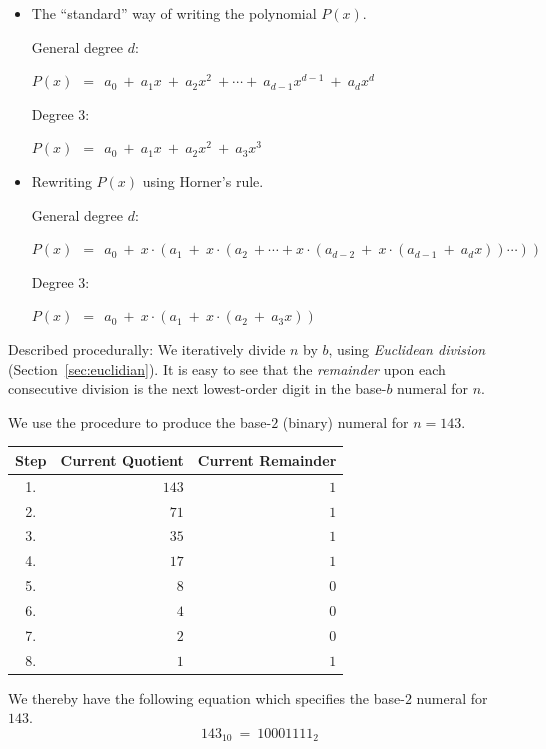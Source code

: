 \begin{itemize}
\item {\small\sf The ``standard'' way of writing the polynomial $P(x)$.}

\noindent General degree $d$:

$P(x) \ \ = \ \ a_0 \ + \ a_1 x \ + \ a_2 x^2 \ + \cdots + \ a_{d-1}
x^{d-1} \ + \ a_d x^d$

\noindent Degree $3$:

$P(x) \ \ = \ \ a_0 \ + \ a_1 x \ + \ a_2 x^2 \ + \ a_3 x^3$

\item {\small\sf Rewriting $P(x)$ using Horner's rule.}

\noindent General degree $d$:

$P(x) \ \ = \ \ a_0 \ + \ x \cdot (a_1 \ + \ x \cdot (a_2  \ +  \cdots
+ x \cdot (a_{d-2} \ + \ x \cdot (a_{d-1} \ + \ a_d x)) \cdots ))$  

\noindent Degree $3$:

$P(x) \ \ = \ \ a_0 \ + \ x \cdot (a_1 \ + \ x \cdot (a_2  \ + \ a_3 x))$ 
\end{itemize}

\noindent
Described procedurally: We iteratively divide $n$ by $b$, using {\it
  Euclidean division} (Section~\ref{sec:euclidian}).  It is easy to
see that the {\em remainder} upon each consecutive division is the
next lowest-order digit in the base-$b$ numeral for $n$.

\bigskip

We use the procedure to produce the base-$2$ (binary) numeral for $n =
143$.

\medskip

\begin{tabular}{|c|r|r|}
\hline
Step &
Current Quotient &
Current Remainder \\
\hline
1. & $143$ & $1$ \\
2. & $71$  & $1$ \\
3. & $35$  & $1$ \\
4. & $17$  & $1$ \\
5. & $8$   & $0$ \\
6. & $4$   & $0$ \\
7. & $2$   & $0$ \\
8. & $1$   & $1$ \\
\hline
\end{tabular}

\medskip

\noindent
We thereby have the following equation which specifies the base-$2$
numeral for $143$.
\[ 143_{10} \ = \ 10001111_2 \]

